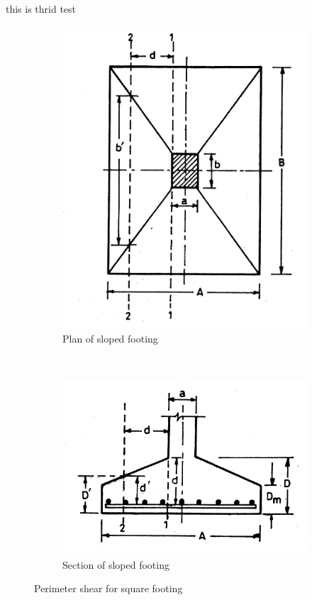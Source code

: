 \documentclass{report}
\begin{document}
this is thrid test
\begin{figure}[h]
  \centering
  \begin{subfigure}[b]{0.5\textwidth}
    \includegraphics[width=\textwidth]{images/fig2321.png}
    \caption{Plan of sloped footing}
    \label{fig:1}
  \end{subfigure}\\
  \begin{subfigure}[b]{0.5\textwidth}
    \includegraphics[width=\textwidth]{images/fig2322.png}
    \caption{Section of sloped footing}
    \label{fig:2}
  \end{subfigure}
\caption{Perimeter shear for square footing}
\end{figure}
\end{document}

